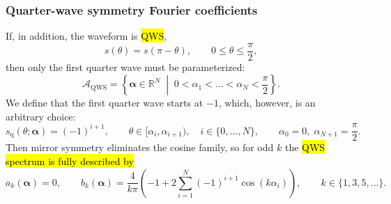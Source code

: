 \begin{frame}
    \frametitle{Quarter-wave symmetry Fourier coefficients}
    If, in addition, the waveform is \hl{QWS},
    \begin{equation}
        s(\theta)=s(\pi-\theta),
        \qquad
        0\leq\theta\leq\frac{\pi}{2},
    \end{equation}\pause
    then only the first quarter wave must be parameterized:
    \begin{equation}
        \mathcal{A}_{\mathrm{QWS}}=
        \left\{
        \bm{\alpha}\in\mathbb{R}^N \;\middle|\;
        0<\alpha_1<\ldots<\alpha_N<\frac{\pi}{2}
        \right\}.
    \end{equation}\pause
    We define that the first quarter wave starts at \(-1\), which, however, is an arbitrary choice:
    \begin{equation}
        s_\mathrm{q}(\theta;\bm{\alpha}) = (-1)^{i+1},
        \qquad
        \theta\in[\alpha_i,\alpha_{i+1}),
        \quad i\in\{0,\ldots,N\},
        \qquad
        \alpha_0=0,\; \alpha_{N+1}=\frac{\pi}{2}.
    \end{equation}\pause
    Then mirror symmetry eliminates the cosine family, so for odd \(k\) the \hl{QWS spectrum is fully described by}
    \begin{equation}
        a_k(\bm{\alpha})=0,
        \qquad
        b_k(\bm{\alpha})=\frac{4}{k\pi}
        \left(-1+2\sum_{i=1}^{N}(-1)^{i+1}\cos(k\alpha_i)\right),
        \qquad
        k\in\{1,3,5,\ldots\}.
        \label{eq:opp_harmonics_rev4}
    \end{equation}
\end{frame}

